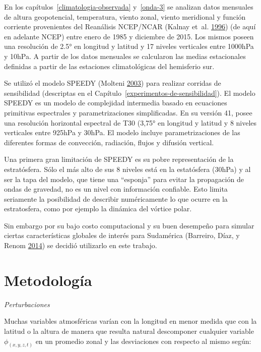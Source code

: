 \documentclass[spanish,a4paper,12p]{book}
\begin{document}
En los capítulos~\ref{climatologia-observada} y~\ref{onda-3} se analizan
datos mensuales de altura geopotencial, temperatura, viento zonal,
viento meridional y función corriente provenientes del Reanálisis
NCEP/NCAR (Kalnay et~al. \protect\hyperlink{ref-Kalnay1996}{1996}) (de
aquí en adelante NCEP) entre enero de 1985 y diciembre de 2015. Los
mismos poseen una resolución de 2.5° en longitud y latitud y 17 niveles
verticales entre 1000hPa y 10hPa. A partir de los datos mensuales se
calcularon las medias estacionales definidas a partir de las estaciones
climatológicas del hemisferio sur.

Se utilizó el modelo SPEEDY (Molteni
\protect\hyperlink{ref-Molteni2003}{2003}) para realizar corridas de
sensibilidad (descriptas en el
Capítulo~\ref{experimentos-de-sensibilidad}). El modelo SPEEDY es un
modelo de complejidad intermedia basado en ecuaciones primitivas
espectrales y parametrizaciones simplificadas. En su versión 41, posee
una resolución horizontal espectral de T30 (3,75° en longitud y latitud
y 8 niveles verticales entre 925hPa y 30hPa. El modelo incluye
parametrizaciones de las diferentes formas de convección, radiación,
flujos y difusión vertical.

Una primera gran limitación de SPEEDY es su pobre representación de la
estratósfera. Sólo el más alto de sus 8 niveles está en la estatósfera
(30hPa) y al ser la tapa del modelo, que tiene una ``esponja'' para
evitar la propagación de ondas de gravedad, no es un nivel con
información confiable. Esto limita seriamente la posibilidad de
describir numéricamente lo que ocurre en la estratosfera, como por
ejemplo la dinámica del vórtice polar.

Sin embargo por su bajo costo computacional y su buen desempeño para
simular ciertas características globales de interés para Sudamérica
(Barreiro, Díaz, y Renom \protect\hyperlink{ref-Barreiro2014}{2014}) se
decidió utilizarlo en este trabajo.

\section{Metodología}\label{metodologia}

\emph{Perturbaciones}

Muchas variables atmosféricas varían con la longitud en menor medida que
con la latitud o la altura de manera que resulta natural descomponer
cualquier variable \(\phi_{(x, y, z, t)}\) en un promedio zonal y las
desviaciones con respecto al mismo según:
\end{document}
